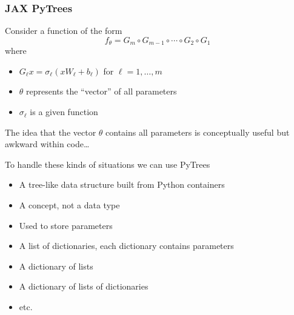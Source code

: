 \begin{frame}
    \frametitle{JAX PyTrees}

    Consider a function of the form
    \begin{equation*}
        f_\theta
        = G_{m} \circ G_{m-1} \circ \cdots \circ G_{2}  \circ G_{1}
    \end{equation*}
    where
    \begin{itemize}
        \item $G_{\ell} x = \sigma_\ell(x W_\ell + b_\ell)$ 
            for $\ell = 1, \ldots, m$
        \vspace{0.5em}
        \item $\theta$ represents the ``vector'' of all parameters
        \vspace{0.5em}
        \item $\sigma_\ell$ is a given function
    \end{itemize}

        \vspace{0.5em}
        \vspace{0.5em}
    The idea that the vector $\theta$ contains all parameters is conceptually
    useful but awkward within code\ldots



\end{frame}


\begin{frame}

    To handle these kinds of situations we can use PyTrees
    
    \begin{itemize}
        \item A tree-like data structure built from Python containers
        \vspace{0.5em}
        \item A concept, not a data type
        \vspace{0.5em}
        \item Used to store parameters
    \end{itemize}

    \vspace{0.5em}
    \vspace{0.5em}
    \Egs

    \begin{itemize}
        \item A list of dictionaries, each dictionary contains parameters
        \item A dictionary of lists 
        \item A dictionary of lists of dictionaries
        \item etc.
    \end{itemize}

\end{frame}




